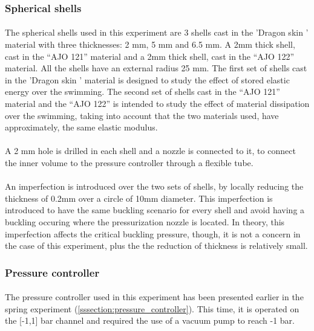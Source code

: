 \subsubsection{Spherical shells}
\paragraph{}
The spherical shells used in this experiment are 3 shells cast in the 'Dragon skin ' material with three thicknesses: 2 mm, 5 mm and 6.5 mm. A 2mm thick shell, cast in the "`AJO 121"' material and a 2mm thick shell, cast in the "`AJO 122"' material. All the shells have an external radius 25 mm. 
The first set of shells cast in the 'Dragon skin ' material is designed to study the effect of stored elastic energy over the swimming.
The second set of shells cast in the "`AJO 121"' material and the "`AJO 122"' is intended to study the effect of material dissipation over the swimming, taking into account that the two materials used, have approximately, the same elastic modulus.
\paragraph{}
A 2 mm hole is drilled in each shell and a nozzle is connected to it, to connect the inner volume to the pressure controller through a flexible tube.
\paragraph{}
An imperfection is introduced over the two sets of shells, by locally reducing the thickness of 0.2mm over a circle of 10mm diameter. This imperfection is introduced to have the same buckling scenario for every shell and avoid having a buckling occuring where the pressurization nozzle is located.
In theory, this imperfection affects the critical buckling pressure\cite{Preis}, though, it is not a concern in the case of this experiment, plus the the reduction of thickness is relatively small.
\subsubsection{Pressure controller}
\paragraph{}
The pressure controller used in this experiment has been presented earlier in the spring experiment (\ref{sssection:pressure_controller}). This time, it is operated on the [-1,1] bar channel and required the use of a vacuum pump to reach -1 bar.
